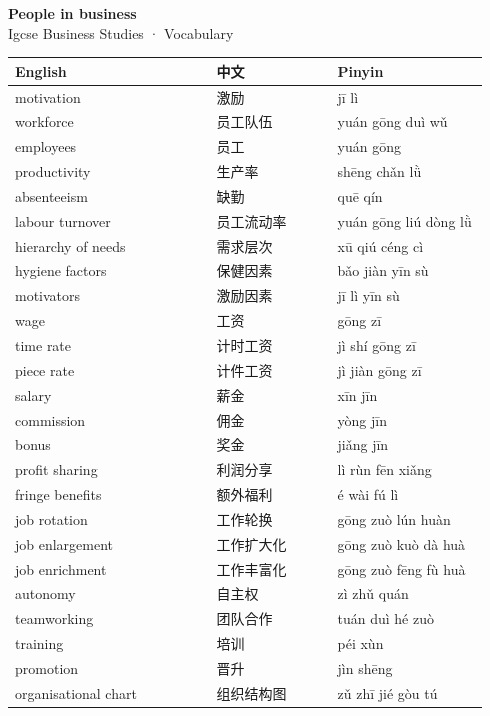 \documentclass[11pt]{article}
\begin{document}
\begin{center}
  {\LARGE\bfseries People in business}\\[0.35em]
  {\large Igcse Business Studies · Vocabulary}
\end{center}
\vspace{0.6em}

\begin{longtable}{@{}p{0.40\linewidth}p{0.24\linewidth}p{0.30\linewidth}@{}}
\toprule
\textbf{English} & \textbf{中文} & \textbf{Pinyin} \\
\midrule
\endhead
\bottomrule
\endlastfoot
motivation & 激励 & jī lì \\
workforce & 员工队伍 & yuán gōng duì wǔ \\
employees & 员工 & yuán gōng \\
productivity & 生产率 & shēng chǎn lǜ \\
absenteeism & 缺勤 & quē qín \\
labour turnover & 员工流动率 & yuán gōng liú dòng lǜ \\
hierarchy of needs & 需求层次 & xū qiú céng cì \\
hygiene factors & 保健因素 & bǎo jiàn yīn sù \\
motivators & 激励因素 & jī lì yīn sù \\
wage & 工资 & gōng zī \\
time rate & 计时工资 & jì shí gōng zī \\
piece rate & 计件工资 & jì jiàn gōng zī \\
salary & 薪金 & xīn jīn \\
commission & 佣金 & yòng jīn \\
bonus & 奖金 & jiǎng jīn \\
profit sharing & 利润分享 & lì rùn fēn xiǎng \\
fringe benefits & 额外福利 & é wài fú lì \\
job rotation & 工作轮换 & gōng zuò lún huàn \\
job enlargement & 工作扩大化 & gōng zuò kuò dà huà \\
job enrichment & 工作丰富化 & gōng zuò fēng fù huà \\
autonomy & 自主权 & zì zhǔ quán \\
teamworking & 团队合作 & tuán duì hé zuò \\
training & 培训 & péi xùn \\
promotion & 晋升 & jìn shēng \\
organisational chart & 组织结构图 & zǔ zhī jié gòu tú \\

\end{longtable}
\end{document}
